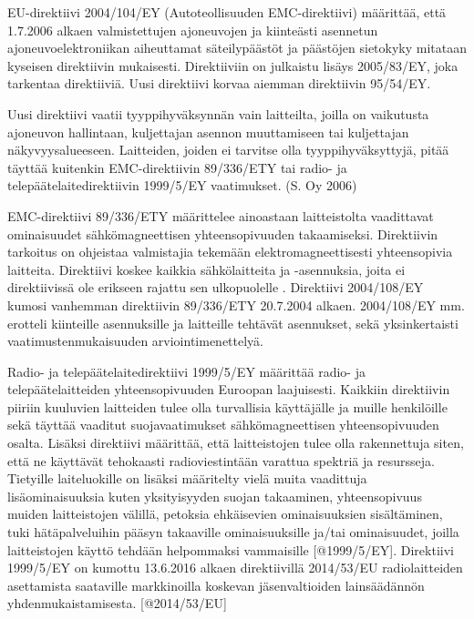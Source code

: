 EU-direktiivi 2004/104/EY (Autoteollisuuden EMC-direktiivi) määrittää, että
1.7.2006 alkaen valmistettujen ajoneuvojen ja kiinteästi asennetun
ajoneuvoelektroniikan aiheuttamat säteilypäästöt ja päästöjen sietokyky
mitataan kyseisen direktiivin mukaisesti. Direktiiviin on julkaistu
lisäys 2005/83/EY, joka tarkentaa direktiiviä. Uusi direktiivi korvaa
aiemman direktiivin 95/54/EY.

Uusi direktiivi vaatii tyyppihyväksynnän vain laitteilta, joilla on
vaikutusta ajoneuvon hallintaan, kuljettajan asennon muuttamiseen tai
kuljettajan näkyvyysalueeseen. Laitteiden, joiden ei tarvitse olla
tyyppihyväksyttyjä, pitää täyttää kuitenkin EMC-direktiivin 89/336/ETY
tai radio- ja telepäätelaitedirektiivin 1999/5/EY vaatimukset. (S. Oy
2006) \cite{1999/5/EY} \cite{89/336/ETY}

EMC-direktiivi 89/336/ETY määrittelee ainoastaan laitteistolta
vaadittavat ominaisuudet sähkömagneettisen yhteensopivuuden
takaamiseksi. Direktiivin tarkoitus on ohjeistaa valmistajia tekemään
elektromagneettisesti yhteensopivia laitteita. Direktiivi koskee kaikkia
sähkölaitteita ja -asennuksia, joita ei direktiivissä ole erikseen
rajattu sen ulkopuolelle \cite{89/336/ETY}. Direktiivi 2004/108/EY
kumosi vanhemman direktiivin 89/336/ETY 20.7.2004 alkaen. 2004/108/EY
mm. erotteli kiinteille asennuksille ja laitteille tehtävät asennukset,
sekä yksinkertaisti vaatimustenmukaisuuden arviointimenettelyä.
\cite{2004/108/EY}

Radio- ja telepäätelaitedirektiivi 1999/5/EY määrittää radio- ja
telepäätelaitteiden yhteensopivuuden Euroopan laajuisesti. Kaikkiin
direktiivin piiriin kuuluvien laitteiden tulee olla turvallisia
käyttäjälle ja muille henkilöille sekä täyttää vaaditut
suojavaatimukset sähkömagneettisen yhteensopivuuden osalta. Lisäksi
direktiivi määrittää, että laitteistojen tulee olla rakennettuja siten,
että ne käyttävät tehokaasti radioviestintään varattua spektriä ja
resursseja. Tietyille laiteluokille on lisäksi määritelty vielä muita
vaadittuja lisäominaisuuksia kuten yksityisyyden suojan takaaminen,
yhteensopivuus muiden laitteistojen välillä, petoksia
ehkäisevien ominaisuuksien sisältäminen, tuki hätäpalveluihin pääsyn takaaville
ominaisuuksille ja/tai ominaisuudet, joilla laitteistojen
käyttö tehdään helpommaksi vammaisille {[}@1999/5/EY{]}. Direktiivi
1999/5/EY on kumottu 13.6.2016 alkaen direktiivillä 2014/53/EU
radiolaitteiden asettamista saataville markkinoilla koskevan
jäsenvaltioiden lainsäädännön yhdenmukaistamisesta. {[}@2014/53/EU{]}

